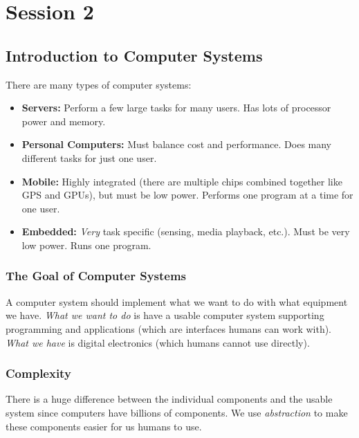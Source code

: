 \section{Session 2}\label{sec:session_2}

\subsection{Introduction to Computer Systems}\label{sub:introduction_to_computer_systems}

There are many types of computer systems:

\begin{itemize}
    \item \textbf{Servers:} Perform a few large tasks for many users. Has lots of processor power and memory.
    \item \textbf{Personal Computers:} Must balance cost and performance. Does many different tasks for just one user.
    \item \textbf{Mobile:} Highly integrated (there are multiple chips combined together like GPS and GPUs), but must be low power. Performs one program at a time for one user.
    \item \textbf{Embedded:} \emph{Very} task specific (sensing, media playback, etc.). Must be very low power. Runs one program.
\end{itemize}

\subsubsection{The Goal of Computer Systems}\label{ssub:the_goal_of_computer_systems}

A computer system should implement what we want to do with what equipment we have.
\emph{What we want to do} is have a usable computer system supporting programming and applications (which are interfaces humans can work with).
\emph{What we have} is digital electronics (which humans cannot use directly).

\subsubsection{Complexity}\label{ssub:complexity}

There is a huge difference between the individual components and the usable system since computers have billions of components.
We use \emph{abstraction} to make these components easier for us humans to use.

